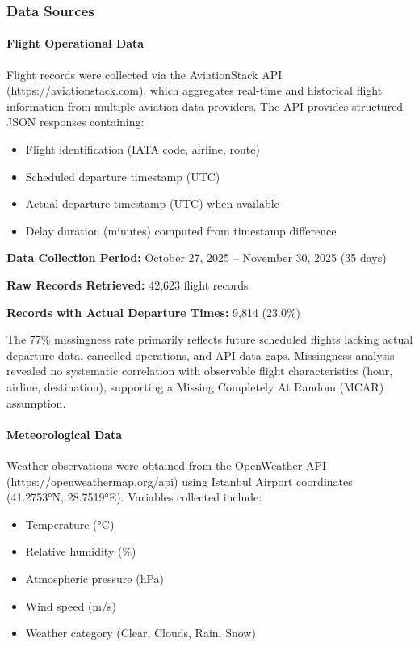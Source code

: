\documentclass{report}
\begin{document}
\subsubsection{Data Sources}

\paragraph{Flight Operational Data}

Flight records were collected via the AviationStack API (https://aviationstack.com), which aggregates real-time and historical flight information from multiple aviation data providers. The API provides structured JSON responses containing:

\begin{itemize}
    \item Flight identification (IATA code, airline, route)
    \item Scheduled departure timestamp (UTC)
    \item Actual departure timestamp (UTC) when available
    \item Delay duration (minutes) computed from timestamp difference
\end{itemize}

\textbf{Data Collection Period:} October 27, 2025 -- November 30, 2025 (35 days)

\textbf{Raw Records Retrieved:} 42,623 flight records

\textbf{Records with Actual Departure Times:} 9,814 (23.0\%)

The 77\% missingness rate primarily reflects future scheduled flights lacking actual departure data, cancelled operations, and API data gaps. Missingness analysis revealed no systematic correlation with observable flight characteristics (hour, airline, destination), supporting a Missing Completely At Random (MCAR) assumption.

\paragraph{Meteorological Data}

Weather observations were obtained from the OpenWeather API (https://openweathermap.org/api) using Istanbul Airport coordinates (41.2753°N, 28.7519°E). Variables collected include:

\begin{itemize}
    \item Temperature (°C)
    \item Relative humidity (\%)
    \item Atmospheric pressure (hPa)
    \item Wind speed (m/s)
    \item Weather category (Clear, Clouds, Rain, Snow)
\end{itemize}
\end{document}
